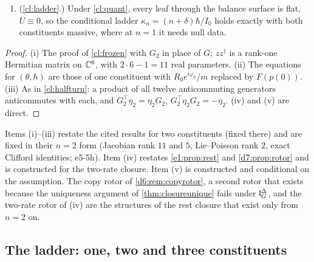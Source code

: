 \begin{proposition}
\begin{enumerate}[label=(\roman*),leftmargin=2.2em]
frequency $(m_1^2+m_2^2)^{1/2}$ and the ungraded one the two frequencies $m_1$, $m_2$ (\cref{e1:prop:rest}(v)). A closure with two rates exists, with
the rotor acting by $\operatorname{diag}(\kappa_1,\kappa_2)\otimes G$, $\kappa_1\neq\kappa_2$ (\cref{d7:prop:rotor}), and is admitted, not selected.
\item (\cref{cl:ladder}.) Under \cref{cl:quant}, every leaf through the balance surface is flat, $U\equiv0$, so the
conditional ladder $\kappa_n=(n+\delta)\hbar/I_0$ holds exactly with both constituents massive, where at $n=1$ it needs null data.
\end{enumerate}
\end{proposition}

\begin{proof}
(i) The proof of \cref{cl:frozen} with $G_2$ in place of $G$; $zz^\dagger$ is a rank-one Hermitian matrix on $\mathbb{C}^6$, with $2\cdot6-1=11$ real
parameters. (ii) The equations for $(\theta,h)$ are those of one constituent with $R_0e^{i\varphi_0}/m$ replaced by $F(p(0))$. (iii) As in \cref{cl:halfturn}: a product of all twelve anticommuting generators anticommutes with each, and $G_2^{\!\top}\eta_2=\eta_2G_2$, $G_2^{\!\top}\eta_2G_2=-\eta_2$.
(iv) and (v) are direct.
\end{proof}

Items (i)--(iii) restate the cited results for two constituents (fixed there) and are fixed in their $n=2$ form (Jacobian rank $11$ and $5$, Lie--Poisson
rank $2$, exact Clifford identities; e5-5h). Item (iv) restates \cref{e1:prop:rest} and \cref{d7:prop:rotor} and is constructed for the two-rate
closure. Item (v) is constructed and conditional on the assumption. The copy rotor of \cref{d6:rem:copyrotor}, a second rotor that exists because the
uniqueness argument of \cref{thm:closureunique} fails under $\mathfrak l_G^\Delta$, and the two-rate rotor of (iv) are the structures of the rest closure that exist only from $n=2$ on.

\subsection{The ladder: one, two and three constituents}
\label{e5:sec:ladder}

